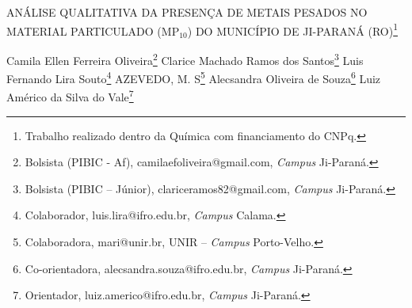 \documentclass[article,12pt,onesidea,4paper,english,brazil]{abntex2}
\begin{document}
	
	
	\frenchspacing 
	
	\begin{center}
		\LARGE ANÁLISE QUALITATIVA DA PRESENÇA DE METAIS PESADOS NO MATERIAL		
		PARTICULADO (MP$_{10}$) DO MUNICÍPIO DE JI-PARANÁ (RO)\footnote{Trabalho realizado dentro da Química com financiamento do CNPq.}
		
		\normalsize
		Camila Ellen Ferreira Oliveira\footnote{Bolsista (PIBIC - Af), camilaefoliveira@gmail.com, \textit{Campus} Ji-Paraná.} 
		Clarice Machado Ramos dos Santos\footnote{Bolsista (PIBIC – Júnior), clariceramos82@gmail.com, \textit{Campus} Ji-Paraná.} 
		Luis Fernando Lira Souto\footnote{Colaborador, luis.lira@ifro.edu.br, \textit{Campus} Calama.} 
		AZEVEDO, M. S\footnote{Colaboradora, mari@unir.br, UNIR – \textit{Campus} Porto-Velho.}
		Alecsandra Oliveira de Souza\footnote{Co-orientadora, alecsandra.souza@ifro.edu.br, \textit{Campus} Ji-Paraná.}
		Luiz Américo da Silva do Vale\footnote{Orientador, luiz.americo@ifro.edu.br, \textit{Campus} Ji-Paraná.} 
	\end{center}
	
\end{document}
